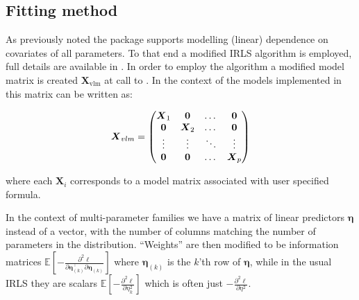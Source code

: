 \documentclass[
]{jss}
\newcommand{\1}{\mathcal{I}} \newcommand{\bZero}{\boldsymbol{0}}
\begin{document}
\subsection{Fitting method}\label{fitting-method}

As previously noted the  package supports modelling
(linear) dependence on covariates of all parameters. To that end a
modified IRLS algorithm is employed, full details are available in
\cite{VGAM-main}. In order to employ the algorithm a modified model
matrix is created \(\boldsymbol{X}_{\text{vlm}}\) at call to
. In the context of the models implemented in
 this matrix can be written as:

\begin{equation}\label{X_vlm-definition}
  \boldsymbol{X}_{vlm}=
  \begin{pmatrix}
    \boldsymbol{X}_{1} & \boldsymbol{0}&\dotso &\boldsymbol{0}\cr
    \boldsymbol{0}& \boldsymbol{X}_{2} &\dotso &\boldsymbol{0}\cr
    \vdots & \vdots & \ddots & \vdots\cr
    \boldsymbol{0}& \boldsymbol{0}&\dotso &\boldsymbol{X}_{p}
  \end{pmatrix}
\end{equation}

where each \(\boldsymbol{X}_{i}\) corresponds to a model matrix
associated with user specified formula.

In the context of multi-parameter families we have a matrix of linear
predictors \(\boldsymbol{\eta}\) instead of a vector, with the number of
columns matching the number of parameters in the distribution.
``Weights'' are then modified to be information matrices
\(\displaystyle\mathbb{E}\left[-\frac{\partial^{2}\ell}{\partial\boldsymbol{\eta}_{(k)}^\top\partial\boldsymbol{\eta}_{(k)}}\right]\)
where \(\boldsymbol{\eta}_{(k)}\) is the \(k\)'th row of
\(\boldsymbol{\eta}\), while in the usual IRLS they are scalars
\(\displaystyle\mathbb{E}\left[-\frac{\partial^{2}\ell}{\partial\eta_{k}^{2}}\right]\)
which is often just
\(\displaystyle-\frac{\partial^{2}\ell}{\partial\eta^{2}}\).
\end{document}
